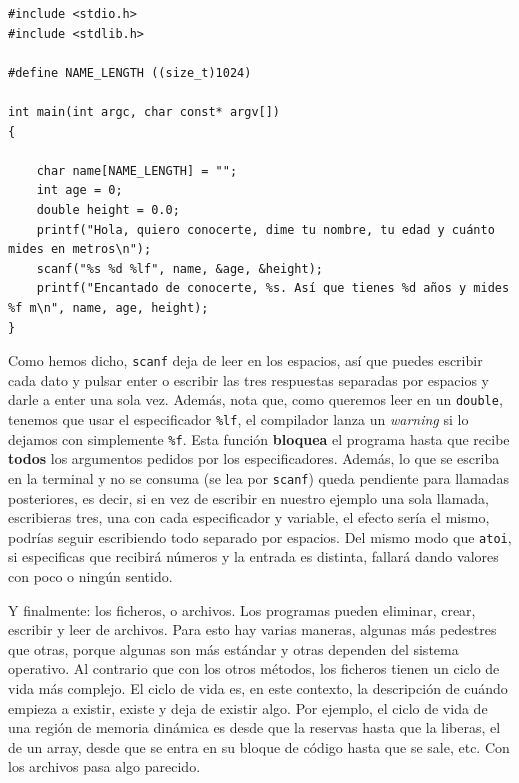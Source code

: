 \documentclass[a4paper]{article}
\begin{document}
\noindent
\begin{minipage}[H]{\linewidth}
\mbox{}
\begin{lstlisting}[style=C,
caption={Ejemplo avanzado de \texttt{scanf}},
label={lst:scanfExample}]
#include <stdio.h>
#include <stdlib.h>

#define NAME_LENGTH ((size_t)1024)

int main(int argc, char const* argv[])
{

    char name[NAME_LENGTH] = "";
    int age = 0;
    double height = 0.0;
    printf("Hola, quiero conocerte, dime tu nombre, tu edad y cuánto mides en metros\n");
    scanf("%s %d %lf", name, &age, &height);
    printf("Encantado de conocerte, %s. Así que tienes %d años y mides %f m\n", name, age, height);
}
\end{lstlisting}
\end{minipage}

Como hemos dicho, \verb!scanf! deja de leer en los espacios, así que puedes
escribir cada dato y pulsar enter o escribir las tres respuestas separadas
por espacios y darle a enter una sola vez. Además, nota que, como queremos
leer en un \verb!double!, tenemos que usar el especificador \verb!%lf!,
el compilador lanza un \emph{warning} si lo dejamos con simplemente \verb!%f!.
Esta función
\textbf{bloquea} el programa hasta que recibe \textbf{todos} los argumentos
pedidos por los especificadores. Además, lo que se escriba en la terminal y
no se consuma (se lea por \verb!scanf!) queda pendiente para llamadas
posteriores, es decir, si en vez de escribir en nuestro ejemplo una sola
llamada, escribieras tres, una con cada especificador y variable, el efecto
sería el mismo, podrías seguir escribiendo todo separado por espacios. Del
mismo modo que \verb!atoi!, si especificas que recibirá números y la entrada
es distinta, fallará dando valores con poco o ningún sentido.

Y finalmente: los ficheros, o archivos. Los programas pueden eliminar, crear,
escribir y leer de archivos. Para esto hay varias maneras, algunas más pedestres
que otras, porque algunas son más estándar y otras dependen del sistema
operativo. Al contrario que con los otros métodos, los ficheros tienen un
ciclo de vida más complejo. El ciclo de vida es, en este contexto, la descripción
de cuándo empieza a existir, existe y deja de existir algo. Por ejemplo,
el ciclo de vida de una región de memoria dinámica es desde que la reservas
hasta que la liberas, el de un array, desde que se entra en su bloque de código
hasta que se sale, etc. Con los archivos pasa algo parecido.
\end{document}
